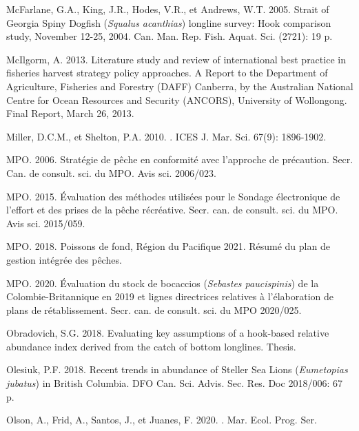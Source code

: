 \documentclass[french,11pt]{book}
\begin{document}
\begin{CSLReferences}{1}{0}
%
McFarlane, G.A., King, J.R., Hodes, V.R., et Andrews, W.T. 2005. {Strait} of {Georgia Spiny Dogfish} ({\emph{Squalus acanthias}}) longline survey: Hook comparison study, {November} 12-25, 2004. Can. Man. Rep. Fish. Aquat. Sci. (2721): 19 p.

%
McIlgorm, A. 2013. Literature study and review of international best practice in fisheries harvest strategy policy approaches. {A} Report to the {Department of Agriculture, Fisheries and Forestry (DAFF) Canberra, by the Australian National Centre for Ocean Resources and Security (ANCORS), University of Wollongong. Final Report, March 26, 2013}.

%
Miller, D.C.M., et Shelton, P.A. 2010. . ICES J. Mar. Sci. 67(9): 1896‑1902.

%
MPO. 2006. Stratégie de pêche en conformité avec l'approche de précaution. Secr. Can. de consult. sci. du MPO. Avis sci. 2006/023.

%
MPO. 2015. Évaluation des méthodes utilisées pour le Sondage électronique de l'effort et des prises de la pêche récréative. Secr. can. de consult. sci. du MPO. Avis sci. 2015/059.

%
MPO. 2018. {Poissons de fond, Région du Pacifique 2021. Résumé du plan de gestion intégrée des pêches}.

%
MPO. 2020. Évaluation du stock de bocaccios ({\emph{Sebastes paucispinis}}) de la {Colombie-Britannique} en 2019 et lignes directrices relatives à l'élaboration de plans de rétablissement. Secr. can. de consult. sci. du MPO 2020/025.

%
Obradovich, S.G. 2018. Evaluating key assumptions of a hook-based relative abundance index derived from the catch of bottom longlines. Thesis.

%
Olesiuk, P.F. 2018. Recent trends in abundance of {Steller} Sea Lions ({\emph{Eumetopias jubatus}}) in {British Columbia}. DFO Can. Sci. Advis. Sec. Res. Doc 2018/006: 67 p.

%
Olson, A., Frid, A., Santos, J., et Juanes, F. 2020. . Mar. Ecol. Prog. Ser.


\end{CSLReferences}
\end{document}
